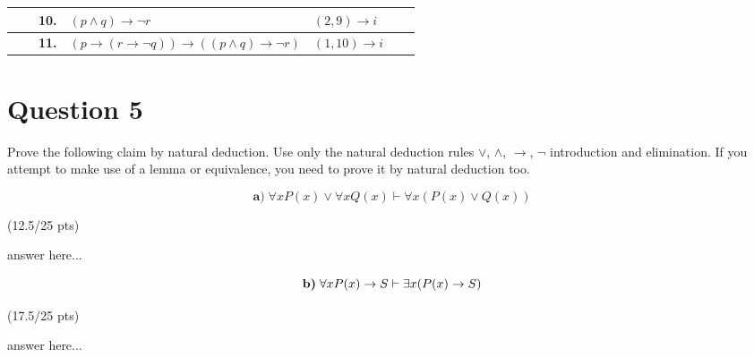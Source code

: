 \documentclass[a4paper,12pt]{article}
\newcommand\tab[1][1cm]{\hspace*{#1}}
\begin{document}
\begin{tcolorbox}
\begin{tabular}{|l|lrlll|l|}
\cline{2-6}
\multicolumn{1}{|l}{} &                       & \textbf{10.} & $(p\wedge q)\rightarrow \neg r $                                                   & $(2, 9) \rightarrow i $                      & \multicolumn{1}{l}{} &                       \\ 
\hline
\multicolumn{1}{l}{}  &                       & \textbf{11.} & $(p\rightarrow (r\rightarrow \neg q))\rightarrow ((p\wedge q)\rightarrow \neg r)$  & $(1, 10) \rightarrow i$                      & \multicolumn{1}{l}{} & \multicolumn{1}{l}{} 
\end{tabular}
\end{tcolorbox}
\newpage
\section*{Question 5 \hfill {}}
\tab Prove the following claim by natural deduction. Use only the natural deduction rules $\vee$, $\wedge$, $\rightarrow$, $\neg$ introduction and elimination. If you attempt to make use of a lemma or equivalence, you need to prove it by natural deduction too.


\begin{equation*}
    \textbf{a)} \; \forall x P(x) \vee \forall x Q(x) \vdash \forall x (P(x) \vee Q(x)) 
\end{equation*}

\hfill \small{(12.5/25 pts)}\\
\begin{tcolorbox}
answer here...
\vspace{1cm} %
\end{tcolorbox}

\begin{equation*}
    \textbf{b)} \; \forall x P(x) \rightarrow S \vdash \exists x (P(x)\rightarrow S)\\
\end{equation*}

\hfill \small{(17.5/25 pts)}\\
\begin{tcolorbox}
answer here...
\vspace{1cm} %
\end{tcolorbox}
\end{document}
